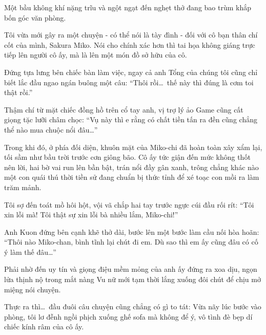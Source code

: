 \documentclass[../main.tex]{subfiles}
\begin{document}


Một bầu không khí nặng trĩu và ngột ngạt đến nghẹt thở đang bao trùm khắp bốn góc văn phòng.

Tôi vừa mới gây ra một chuyện - có thể nói là tày đình - đối với cô bạn thân chí cốt của mình, Sakura Miko. Nói cho chính xác hơn thì tai họa không giáng trực tiếp lên người cô ấy, mà là lên một món đồ sở hữu của cô.

Đứng tựa lưng bên chiếc bàn làm việc, ngay cả anh Tổng của chúng tôi cũng chỉ biết lắc đầu ngao ngán buông một câu: ``Thôi rồi\dots\ thế này thì đúng là cơm toi thật rồi.''

Thậm chí từ mặt chiếc đồng hồ trên cổ tay anh, vị trợ lý ảo Game cũng cất giọng tặc lưỡi châm chọc: ``Vụ này thì e rằng có chất tiền tấn ra đền cũng chẳng thể nào mua chuộc nổi đâu\dots''

Trong khi đó, ở phía đối diện, khuôn mặt của Miko-chi đã hoàn toàn xây xẩm lại, tối sầm như bầu trời trước cơn giông bão. Cô ấy tức giận đến mức không thốt nên lời, hai bờ vai run lên bần bật, trán nổi đầy gân xanh, trông chẳng khác nào một con quái thú thời tiền sử đang chuẩn bị thức tỉnh để xé toạc con mồi ra làm trăm mảnh.

Tôi sợ đến toát mồ hôi hột, vội vã chắp hai tay trước ngực cúi đầu rối rít: ``Tôi xin lỗi mà! Tôi thật sự xin lỗi bà nhiều lắm, Miko-chi!''

Anh Kuon đứng bên cạnh khẽ thở dài, bước lên một bước làm cầu nối hòa hoãn: ``Thôi nào Miko-chan, bình tĩnh lại chút đi em. Dù sao thì em ấy cũng đâu có cố ý làm thế đâu\dots''

Phải nhờ đến uy tín và giọng điệu mềm mỏng của anh ấy đứng ra xoa dịu, ngọn lửa thịnh nộ trong mắt nàng Vu nữ mới tạm thời lắng xuống đôi chút để chịu mở miệng nói chuyện.

Thực ra thì\dots\ đầu đuôi câu chuyện cũng chẳng có gì to tát: Vừa nãy lúc bước vào phòng, tôi lơ đễnh ngồi phịch xuống ghế sofa mà không để ý, vô tình đè bẹp dí chiếc kính râm của cô ấy.
\end{document}
